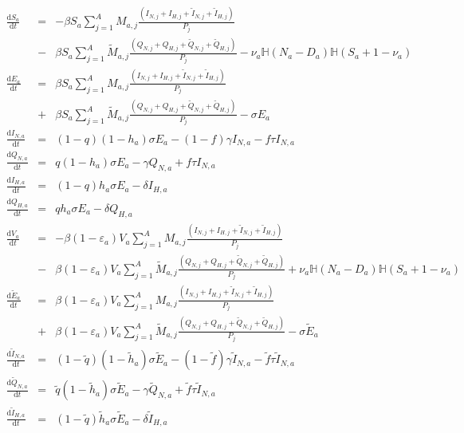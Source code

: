 \documentclass[10pt]{article}
\begin{document}
\begin{eqnarray}
\frac{\text{d}S_{a}}{\text{d}t}&=&- \beta S_a\sum_{j=1}^A M_{a,j} \frac{\left(I_{N,j}+I_{H,j}+ \tilde I_{N,j}+ \tilde I_{H,j} \right)}{P_j} \nonumber \\
&-& \beta S_a \sum_{j=1}^A \tilde M_{a,j}\frac{\left(Q_{N,j}+Q_{H,j}+ \tilde Q_{N,j}+ \tilde Q_{H,j} \right)}{P_j} -\nu_a \mathbb{H}(N_a-D_a)\mathbb{H}(S_a+1-\nu_a)\\
\frac{\text{d}E_{a}}{\text{d}t}&=&  \beta  S_a\sum_{j=1}^A M_{a,j} \frac{\left(I_{N,j}+I_{H,j}+ \tilde I_{N,j}+ \tilde I_{H,j} \right)}{P_j}  \nonumber \\
&+& \beta S_a \sum_{j=1}^A \tilde M_{a,j}\frac{\left(Q_{N,j}+Q_{H,j}+ \tilde Q_{N,j}+ \tilde Q_{H,j} \right)}{P_j}-\sigma E_a\\
\frac{\text{d}I_{N,a}}{\text{d}t}&=&(1-q)(1-h_a)\sigma E_a -(1-f) \gamma I_{N,a} -f \tau I_{N,a}\\
\frac{\text{d}Q_{N,a}}{\text{d}t}&=&q(1-h_a)\sigma E_a -\gamma Q_{N,a} +f \tau I_{N,a} \\
\frac{\text{d}I_{H,a}}{\text{d}t}&=&(1-q)h_a\sigma E_a -\delta  I_{H,a} \\
\frac{\text{d}Q_{H,a}}{\text{d}t}&=&qh_a\sigma E_a - \delta Q_{H,a} \\
\frac{\text{d}V_{a}}{\text{d}t}&=&- \beta (1-\varepsilon_a) V_a\sum_{j=1}^A M_{a,j} \frac{\left(I_{N,j}+I_{H,j}+ \tilde I_{N,j}+ \tilde I_{H,j} \right)}{P_j}  \nonumber \\
&-& \beta (1-\varepsilon_a) V_a \sum_{j=1}^A \tilde M_{a,j}\frac{\left(Q_{N,j}+Q_{H,j}+ \tilde Q_{N,j}+ \tilde Q_{H,j} \right)}{P_j} +\nu_a \mathbb{H}(N_a-D_a)\mathbb{H}(S_a+1-\nu_a)\\
\frac{\text{d}\tilde E_{a}}{\text{d}t} &=&  \beta (1-\varepsilon_a) V_a\sum_{j=1}^A M_{a,j} \frac{\left(I_{N,j}+I_{H,j}+ \tilde I_{N,j}+ \tilde I_{H,j} \right)}{P_j} \nonumber \\
&+& \beta (1-\varepsilon_a) V_a \sum_{j=1}^A \tilde M_{a,j}\frac{\left(Q_{N,j}+Q_{H,j}+ \tilde Q_{N,j}+ \tilde Q_{H,j} \right)}{P_j}-\sigma \tilde E_a \\
\frac{\text{d}\tilde I_{N,a}}{\text{d}t}&=&(1-\tilde q)(1- \tilde h_a)\sigma \tilde E_a -(1-\tilde f) \gamma \tilde I_{N,a} -\tilde f \tau \tilde I_{N,a}\\
\frac{\text{d}\tilde Q_{N,a}}{\text{d}t}&=&\tilde q(1-\tilde h_a)\sigma \tilde E_a -\gamma \tilde Q_{N,a} + \tilde f \tau \tilde I_{N,a}\\
\frac{\text{d}\tilde I_{H,a}}{\text{d}t}&=&(1-\tilde q)\tilde h_a\sigma \tilde E_a - \delta \tilde I_{H,a}  \\

\end{eqnarray}
\end{document}

